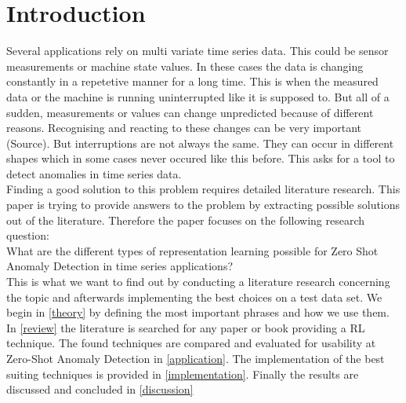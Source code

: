\chapter{Introduction}\label{intro}
Several applications rely on multi variate time series data. This could be sensor measurements or machine state values. In these cases the data is changing constantly in a repetetive manner for a long time. This is when the measured data or the machine is running uninterrupted like it is supposed to. But all of a sudden, measurements or values can change unpredicted because of different reasons. Recognising and reacting to these changes can be very important (Source). But interruptions are not always the same. They can occur in different shapes which in some cases never occured like this before. This asks for a tool to detect anomalies in time series data.\\
Finding a good solution to this problem requires detailed literature research. This paper is trying to provide answers to the problem by extracting possible solutions out of the literature. Therefore the paper focuses on the following research question:\\
What are the different types of representation learning possible for Zero Shot Anomaly Detection in time series applications?\\
This is what we want to find out by conducting a literature research concerning the topic and afterwards implementing the best choices on a test data set. We begin in \ref{theory} by defining the most important phrases and how we use them. In \ref{review} the literature is searched for any paper or book providing a RL technique. The found techniques are compared and evaluated for usability at Zero-Shot Anomaly Detection in \ref{application}. The implementation of the best suiting techniques is provided in \ref{implementation}. Finally the results are discussed and concluded in \ref{discussion}
